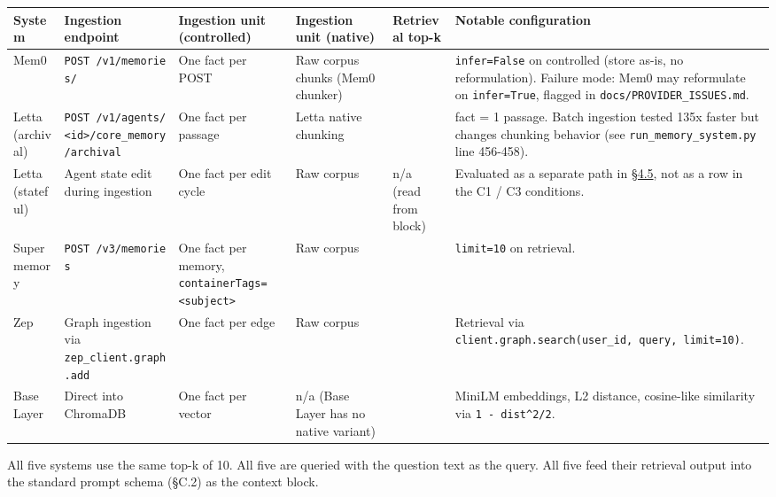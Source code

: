 \begin{landscape}
\begin{longtable}[]{@{}
  >{\raggedright\arraybackslash}p{}
  >{\raggedright\arraybackslash}p{}
  >{\raggedright\arraybackslash}p{}
  >{\raggedright\arraybackslash}p{}
  >{\raggedleft\arraybackslash}p{}
  >{\raggedright\arraybackslash}p{}@{}}
\toprule
System & Ingestion endpoint & Ingestion unit (controlled) & Ingestion
unit (native) & Retrieval top-k & Notable configuration \\
\midrule
\endhead
Mem0 & \texttt{POST\ /v1/memories/} & One fact per POST & Raw corpus
chunks (Mem0 chunker) & 10 & \texttt{infer=False} on controlled (store
as-is, no reformulation). Failure mode: Mem0 may reformulate on
\texttt{infer=True}, flagged in \texttt{docs/PROVIDER\_ISSUES.md}. \\
Letta (archival) &
\texttt{POST\ /v1/agents/\textless{}id\textgreater{}/core\_memory/archival}
& One fact per passage & Letta native chunking & 10 & 1 fact = 1
passage. Batch ingestion tested 135x faster but changes chunking
behavior (see \texttt{run\_memory\_system.py} line 456-458). \\
Letta (stateful) & Agent state edit during ingestion & One fact per edit
cycle & Raw corpus & n/a (read from block) & Evaluated as a separate
path in \hyperref[exploratory-case-study-letta-stateful-agent-n3-post-hoc]{§4.5}, not as a row in the C1 / C3 conditions. \\
Supermemory & \texttt{POST\ /v3/memories} & One fact per memory,
\texttt{containerTags=\textless{}subject\textgreater{}} & Raw corpus &
10 & \texttt{limit=10} on retrieval. \\
Zep & Graph ingestion via \texttt{zep\_client.graph.add} & One fact per
edge & Raw corpus & 10 & Retrieval via
\texttt{client.graph.search(user\_id,\ query,\ limit=10)}. \\
Base Layer & Direct into ChromaDB & One fact per vector & n/a (Base
Layer has no native variant) & 10 & MiniLM embeddings, L2 distance,
cosine-like similarity via \texttt{1\ -\ dist\^{}2/2}. \\
\bottomrule
\end{longtable}
\end{landscape}

All five systems use the same top-k of 10. All five are queried with the
question text as the query. All five feed their retrieval output into
the standard prompt schema (§C.2) as the context block.

